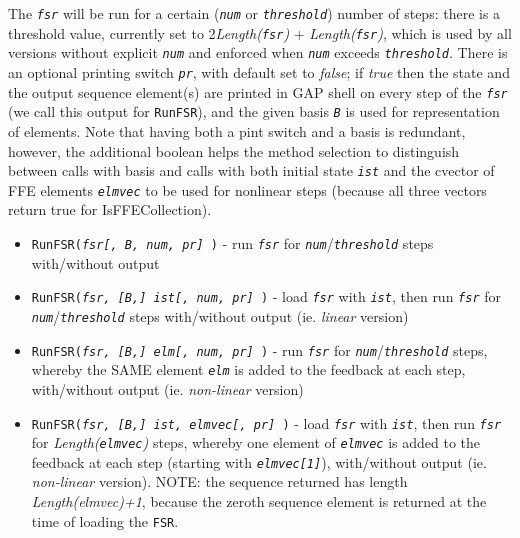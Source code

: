\documentclass[a4paper,11pt]{report}
\begin{document}
{{{ The \mbox{\texttt{\mdseries\slshape fsr}} will be run for a certain (\mbox{\texttt{\mdseries\slshape num}} or \mbox{\texttt{\mdseries\slshape threshold}}) number of steps: there is a threshold value, currently set to
2\texttt{}\emph{Length(\mbox{\texttt{\mdseries\slshape fsr}})} + \emph{Length(\mbox{\texttt{\mdseries\slshape fsr}})}, which is used by all versions without explicit \mbox{\texttt{\mdseries\slshape num}} and enforced when \mbox{\texttt{\mdseries\slshape num}} exceeds \mbox{\texttt{\mdseries\slshape threshold}}. There is an optional printing switch \mbox{\texttt{\mdseries\slshape pr}}, with default set to \emph{false}; if \emph{true} then the state and the output sequence element(s) are printed in \textsf{GAP} shell on every step of the \mbox{\texttt{\mdseries\slshape fsr}} (we call this output for \texttt{RunFSR}), and the given basis \mbox{\texttt{\mdseries\slshape B}} is used for representation of elements. Note that having both a pint switch
and a basis is redundant, however, the additional boolean helps the method
selection to distinguish between calls with basis and calls with both initial
state \mbox{\texttt{\mdseries\slshape ist}} and the cvector of FFE elements \mbox{\texttt{\mdseries\slshape elmvec}} to be used for nonlinear steps (because all three vectors return true for
IsFFECollection). 
\begin{itemize}
\item  \texttt{RunFSR(\mbox{\texttt{\mdseries\slshape  fsr[, B, num, pr] }})} - run \mbox{\texttt{\mdseries\slshape fsr}} for \mbox{\texttt{\mdseries\slshape num}}/\mbox{\texttt{\mdseries\slshape threshold}} steps with/without output
\item  \texttt{RunFSR(\mbox{\texttt{\mdseries\slshape  fsr, [B,] ist[, num, pr] }})} - load \mbox{\texttt{\mdseries\slshape fsr}} with \mbox{\texttt{\mdseries\slshape ist}}, then run \mbox{\texttt{\mdseries\slshape fsr}} for \mbox{\texttt{\mdseries\slshape num}}/\mbox{\texttt{\mdseries\slshape threshold}} steps with/without output (ie. \emph{linear} version)
\item  \texttt{RunFSR(\mbox{\texttt{\mdseries\slshape  fsr, [B,] elm[, num, pr] }})} - run \mbox{\texttt{\mdseries\slshape fsr}} for \mbox{\texttt{\mdseries\slshape num}}/\mbox{\texttt{\mdseries\slshape threshold}} steps, whereby the SAME element \mbox{\texttt{\mdseries\slshape elm}} is added to the feedback at each step, with/without output (ie. \emph{non-linear} version)
\item  \texttt{RunFSR(\mbox{\texttt{\mdseries\slshape  fsr, [B,] ist, elmvec[, pr] }})} - load \mbox{\texttt{\mdseries\slshape fsr}} with \mbox{\texttt{\mdseries\slshape ist}}, then run \mbox{\texttt{\mdseries\slshape fsr}} for \emph{Length(\mbox{\texttt{\mdseries\slshape elmvec}})} steps, whereby one element of \mbox{\texttt{\mdseries\slshape elmvec}} is added to the feedback at each step (starting with \mbox{\texttt{\mdseries\slshape elmvec[1]}}), with/without output (ie. \emph{non-linear} version). NOTE: the sequence returned has length \emph{Length(elmvec)+1}, because the zeroth sequence element is returned at the time of loading the \texttt{FSR}.

\end{itemize}}}}
\end{document}
